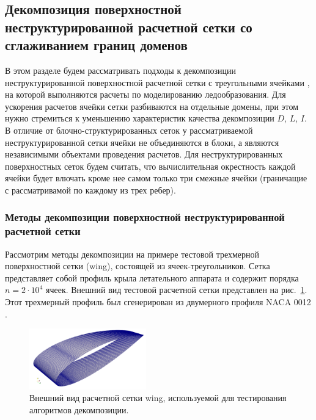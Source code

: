 
\subsection{Декомпозиция поверхностной неструктурированной расчетной сетки со сглаживанием границ доменов}

В этом разделе будем рассматривать подходы к декомпозиции неструктурированной поверхностной расчетной сетки с треугольными ячейками \cite{Rybakov2020Decomp}, на которой выполняются расчеты по моделированию ледообразования.
Для ускорения расчетов ячейки сетки разбиваются на отдельные домены, при этом нужно стремиться к уменьшению характеристик качества декомпозиции $D$, $L$, $I$.
В отличие от блочно-структурированных сеток у рассматриваемой неструктурированной сетки ячейки не объединяются в блоки, а являются независимыми объектами проведения расчетов.
Для неструктурированных поверхностных сеток будем считать, что вычислительная окрестность каждой ячейки будет влючать кроме нее самом только три смежные ячейки (граничащие с рассматривамой по каждому из трех ребер).

\subsubsection{Методы декомпозиции поверхностной \mbox{неструктурированной} расчетной сетки}\label{sec:par_decompsurf_methods}

Рассмотрим методы декомпозиции на примере тестовой трехмерной поверхностной сетки (wing), состоящей из ячеек-треугольников.
Сетка представляет собой профиль крыла летательного аппарата и содержит порядка $n = 2 \cdot 10^4$ ячеек.
Внешний вид тестовой расчетной сетки представлен на рис.~\ref{fig:text_2_decompsurf_wing_grid}.
Этот трехмерный профиль был сгенерирован из двумерного профиля NACA 0012 \cite{Naca0012}.

\begin{figure}[ht]
\centering
\includegraphics[width=0.45\textwidth]{fig/par_wing_grid.png}
\singlespacing
{}\caption{Внешний вид расчетной сетки wing, используемой для тестирования алгоритмов декомпозиции.}
\label{fig:text_2_decompsurf_wing_grid}
\end{figure}

